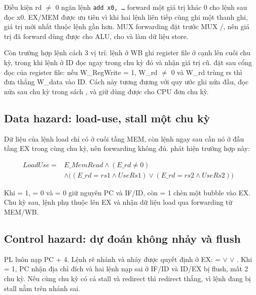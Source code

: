 \documentclass[../report.tex]{subfiles}
\begin{document}
Điều kiện rd $\neq$ 0 ngăn lệnh \texttt{add x0, \ldots} forward một giá trị khác 0 cho lệnh sau đọc x0. EX/MEM được
ưu tiên vì khi hai lệnh liên tiếp cùng ghi một thanh ghi, giá trị mới nhất thuộc lệnh gần hơn. MUX forwarding đặt
trước MUX /, nên giá trị đã forward dùng được cho ALU, cho  và làm dữ liệu
store.

Còn trường hợp lệnh cách 3 vị trí: lệnh ở WB ghi register file ở cạnh lên cuối chu kỳ, trong khi lệnh ở ID đọc
ngay trong chu kỳ đó và nhận giá trị cũ.  đặt sau cổng đọc của register file: nếu W\_RegWrite = 1,
W\_rd $\neq$ 0 và W\_rd trùng rs thì đưa thẳng W\_data vào ID. Cách này tương đương với quy ước ghi nửa đầu, đọc
nửa sau chu kỳ trong sách \cite[ch.~4]{patterson}, và giữ  dùng được cho CPU đơn chu kỳ.

\subsection{Data hazard: load-use, stall một chu kỳ}\label{sec:loaduse}

Dữ liệu của lệnh load chỉ có ở cuối tầng MEM, còn lệnh ngay sau cần nó ở đầu tầng EX trong cùng chu kỳ, nên
forwarding không đủ.  phát hiện trường hợp này:

\begin{align*}
\mathit{LoadUse} = {}& \mathit{E\_MemRead} \land (E\_rd \neq 0) \\
&\land \big((E\_rd = rs1 \land \mathit{UseRs1}) \lor (E\_rd = rs2 \land \mathit{UseRs2})\big)
\end{align*}

Khi  = 1,  = 0 và  = 0 giữ nguyên PC và IF/ID, còn  = 1
chèn một bubble vào EX. Chu kỳ sau, lệnh phụ thuộc lên EX và nhận dữ liệu load qua forwarding từ MEM/WB.

\subsection{Control hazard: dự đoán không nhảy và flush}\label{sec:ctrlhaz}

PL luôn nạp PC + 4. Lệnh rẽ nhánh và nhảy được quyết định ở EX:  =  $\lor$ 
$\lor$ . Khi  = 1, PC nhận địa chỉ đích và hai lệnh nạp sai ở IF/ID và ID/EX bị flush,
mất 2 chu kỳ. Nếu cùng chu kỳ có cả stall và redirect thì redirect thắng, vì lệnh đang bị stall nằm trên nhánh sai.
\end{document}
